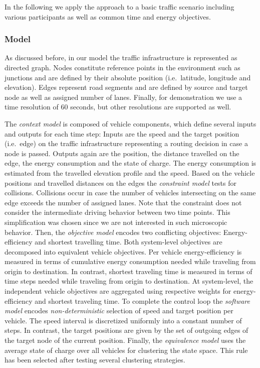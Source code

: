 \documentclass[conference]{../cls/IEEEtran}
\begin{document}
In the following we apply the approach to a basic traffic scenario including various participants as well as common time and energy objectives.

\subsubsection*{Model}

As discussed before, in our model the traffic infrastructure is represented as directed graph. Nodes constitute reference points in the environment such as junctions and are defined by their absolute position (i.e.\ latitude, longitude and elevation). Edges represent road segments and are defined by source and target node as well as assigned number of lanes. Finally, for demonstration we use a time resolution of 60 seconds, but other resolutions are supported as well.

The \textit{context model} is composed of vehicle components, which define several inputs and outputs for each time step: Inputs are the speed and the target position (i.e.\ edge) on the traffic infrastructure representing a routing decision in case a node is passed. Outputs again are the position, the distance travelled on the edge, the energy consumption and the state of charge. The energy consumption is estimated from the travelled elevation profile and the speed. Based on the vehicle positions and travelled distances on the edges the \textit{constraint model} tests for collisions. Collisions occur in case the number of vehicles intersecting on the same edge exceeds the number of assigned lanes. Note that the constraint does not consider the intermediate driving behavior between two time points. This simplification was chosen since we are not interested in such microscopic behavior. Then, the \textit{objective model} encodes two conflicting objectives: Energy-efficiency and shortest travelling time. Both system-level objectives are decomposed into equivalent vehicle objectives. Per vehicle energy-efficiency is measured in terms of cumulative energy consumption needed while traveling from origin to destination. In contrast, shortest traveling time is measured in terms of time steps needed while traveling from origin to destination. At system-level, the independent vehicle objectives are aggregated using respective weights for energy-efficiency and shortest traveling time. To complete the control loop the \textit{software model} encodes \textit{non-deterministic} selection of speed and target position per vehicle. The speed interval is discretized uniformly into a constant number of steps. In contrast, the target positions are given by the set of outgoing edges of the target node of the current position. Finally, the \textit{equivalence model} uses the average state of charge over all vehicles for clustering the state space. This rule has been selected after testing several clustering strategies.
\end{document}
